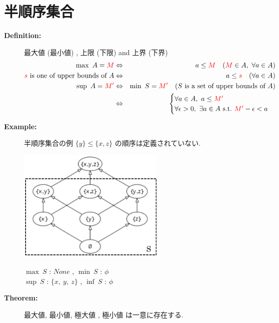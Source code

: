 \documentclass[english,dvipdfmx]{jsarticle}
\begin{document}
\section{半順序集合}
\begin{description}
    \item[\bf{Definition:}] 最大値 (最小値) , 上限 (下限) and 上界 (下界)
    \begin{eqnarray*}
    \max \ A = {\color{red}M}  &\Leftrightarrow& a \leq {\color{red}M} \quad ( {\color{red}M} \in A ,\ \forall a \in A )  \\
    {\color{red}{s}} \text{ is one of upper bounds of } A &\Leftrightarrow& a \leq {\color{red}{s}} \quad ( \forall a \in A ) \\
    \sup \ A = {\color{red}M'} &\Leftrightarrow& \min \ S = {\color{red}M'} \quad ( S \text{ is a set of upper bounds of }A ) \\
    &\Leftrightarrow& \begin{cases}  \forall a \in A  ,\ a \leq {\color{red}M'} \\ \forall \epsilon > 0 ,\ \exists a \in A \ \text{s.t.} \ {\color{red}M'} - \epsilon < a \end{cases}
    \end{eqnarray*}
    \item[\bf{Example:}] 半順序集合の例 $ \{ y \} \leq \{ x,z \} $ の順序は定義されていない. \\
        \begin{minipage}{.4\textwidth}
            \centering\includegraphics[width=7cm]{./set.png}
            \end{minipage}
            \hfill
            \begin{minipage}{.4\textwidth}
        $\max \ S$ : $None$ , $\min \ S$ : $\phi$\\
        $\sup \ S$ : $\{ x,\ y,\ z \}$ , $\inf \ S$ : $\phi$
        \end{minipage}
    \item[\bf{Theorem:}] 最大値, 最小値, 極大値 , 極小値 は一意に存在する.\\

\end{description}
\end{document}
